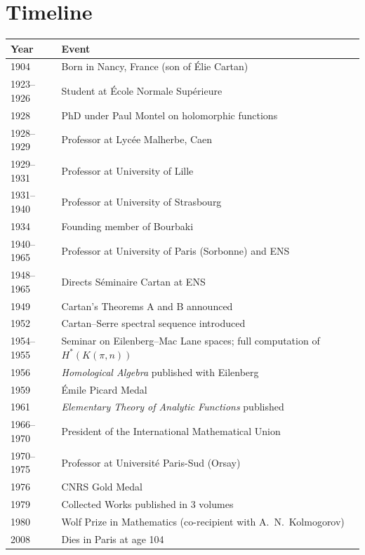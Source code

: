 \section*{Timeline}

\begin{tabularx}{\linewidth}{|p{1.5cm}|>{\raggedright\arraybackslash}X|}
\hline
\textbf{Year} & \textbf{Event} \\ \hline
1904 & Born in Nancy, France (son of {\'E}lie Cartan) \\ \hline
1923--1926 & Student at {\'E}cole Normale Sup{\'e}rieure \\ \hline
1928 & PhD under Paul Montel on holomorphic functions \\ \hline
1928--1929 & Professor at Lyc{\'e}e Malherbe, Caen \\ \hline
1929--1931 & Professor at University of Lille \\ \hline
1931--1940 & Professor at University of Strasbourg \\ \hline
1934 & Founding member of Bourbaki \\ \hline
1940--1965 & Professor at University of Paris (Sorbonne) and ENS \\ \hline
1948--1965 & Directs S{\'e}minaire Cartan at ENS \\ \hline
1949 & Cartan's Theorems A and B announced \\ \hline
1952 & Cartan--Serre spectral sequence introduced \\ \hline
1954--1955 & Seminar on Eilenberg--Mac Lane spaces; full computation of $H^*(K(\pi,n))$ \\ \hline
1956 & \textit{Homological Algebra} published with Eilenberg \\ \hline
1959 & {\'E}mile Picard Medal \\ \hline
1961 & \textit{Elementary Theory of Analytic Functions} published \\ \hline
1966--1970 & President of the International Mathematical Union \\ \hline
1970--1975 & Professor at Universit{\'e} Paris-Sud (Orsay) \\ \hline
1976 & CNRS Gold Medal \\ \hline
1979 & Collected Works published in 3 volumes \\ \hline
1980 & Wolf Prize in Mathematics (co-recipient with A.\ N.\ Kolmogorov) \\ \hline
2008 & Dies in Paris at age 104 \\ \hline
\end{tabularx}
